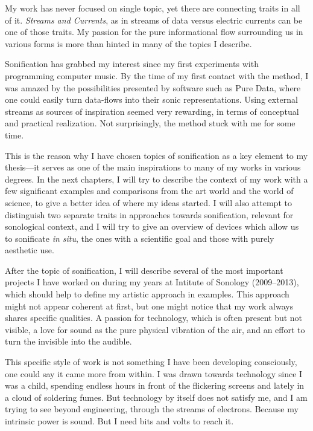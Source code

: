 \documentclass[12pt,a4paper,oneside]{report}
\begin{document}
My work has never focused on single topic, yet there are connecting traits in all of it. \emph{Streams and Currents}, as in streams of data versus electric currents can be one of those traits. My passion for the pure informational flow surrounding us in various forms is more than hinted in many of the topics I describe.

Sonification has grabbed my interest since my first experiments with programming computer music. By the time of my first contact with the method, I was amazed by the possibilities presented by software such as Pure Data, where one could easily turn data-flows into their sonic representations. Using external streams as sources of inspiration seemed very rewarding, in terms of conceptual and practical realization. Not surprisingly, the method stuck with me for some time.

This is the reason why I have chosen topics of sonification as a key element to my thesis---it serves as one of the main inspirations to many of my works in various degrees. In the next chapters, I will try to describe the context of my work with a few significant examples and comparisons from the art world and the world of science, to give a better idea of where my ideas started. I will also attempt to distinguish two separate traits in approaches towards sonification, relevant for sonological context, and I will try to give an overview of devices which allow us to sonificate \textit{in situ}, the ones with a scientific goal and those with purely aesthetic use.

After the topic of sonification, I will describe several of the most important projects I have worked on during my years at Intitute of Sonology (2009--2013), which should help to define my artistic approach in examples. This approach might not appear coherent at first, but one might notice that my work always shares specific qualities. A passion for technology, which is often present but not visible, a love for sound as the pure physical vibration of the air, and an effort to turn the invisible into the audible.

This specific style of work is not something I have been developing consciously, one could say it came more from within. I was drawn towards technology since I was a child, spending endless hours in front of the flickering screens and lately in a cloud of soldering fumes. But technology by itself does not satisfy me, and I am trying to see beyond engineering, through the streams of electrons. Because my intrinsic power is sound. But I need bits and volts to reach it.
\end{document}
